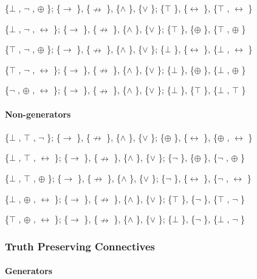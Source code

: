 \{$\bot$ , $\neg$ , $\oplus$ \}; \{$\to$ \}, \{$\nrightarrow$ \}, \{$\land$ \}, \{$\lor$ \}; \{$\top$ \}, \{$\leftrightarrow$ \}, \{$\top$ , $\leftrightarrow$ \}

\{$\bot$ , $\neg$ , $\leftrightarrow$ \}; \{$\to$ \}, \{$\nrightarrow$ \}, \{$\land$ \}, \{$\lor$ \}; \{$\top$ \}, \{$\oplus$ \}, \{$\top$ , $\oplus$ \}

\{$\top$ , $\neg$ , $\oplus$ \}; \{$\to$ \}, \{$\nrightarrow$ \}, \{$\land$ \}, \{$\lor$ \}; \{$\bot$ \}, \{$\leftrightarrow$ \}, \{$\bot$ , $\leftrightarrow$ \}

\{$\top$ , $\neg$ , $\leftrightarrow$ \}; \{$\to$ \}, \{$\nrightarrow$ \}, \{$\land$ \}, \{$\lor$ \}; \{$\bot$ \}, \{$\oplus$ \}, \{$\bot$ , $\oplus$ \}

\{$\neg$ , $\oplus$ , $\leftrightarrow$ \}; \{$\to$ \}, \{$\nrightarrow$ \}, \{$\land$ \}, \{$\lor$ \}; \{$\bot$ \}, \{$\top$ \}, \{$\bot$ , $\top$ \}

\hypertarget{non-generators-1}{%
\paragraph{Non-generators}\label{non-generators-1}}

\{$\bot$ , $\top$ , $\neg$ \}; \{$\to$ \}, \{$\nrightarrow$ \}, \{$\land$ \}, \{$\lor$ \}; \{$\oplus$ \}, \{$\leftrightarrow$ \}, \{$\oplus$ , $\leftrightarrow$ \}

\{$\bot$ , $\top$ , $\leftrightarrow$ \}; \{$\to$ \}, \{$\nrightarrow$ \}, \{$\land$ \}, \{$\lor$ \}; \{$\neg$ \}, \{$\oplus$ \}, \{$\neg$ , $\oplus$ \}

\{$\bot$ , $\top$ , $\oplus$ \}; \{$\to$ \}, \{$\nrightarrow$ \}, \{$\land$ \}, \{$\lor$ \}; \{$\neg$ \}, \{$\leftrightarrow$ \}, \{$\neg$ , $\leftrightarrow$ \}

\{$\bot$ , $\oplus$ , $\leftrightarrow$ \}; \{$\to$ \}, \{$\nrightarrow$ \}, \{$\land$ \}, \{$\lor$ \}; \{$\top$ \}, \{$\neg$ \}, \{$\top$ , $\neg$ \}

\{$\top$ , $\oplus$ , $\leftrightarrow$ \}; \{$\to$ \}, \{$\nrightarrow$ \}, \{$\land$ \}, \{$\lor$ \}; \{$\bot$ \}, \{$\neg$ \}, \{$\bot$ , $\neg$ \}

\hypertarget{truth-preserving-connectives}{%
\subsubsection{Truth Preserving
Connectives}\label{truth-preserving-connectives}}

\hypertarget{generators-2}{%
\paragraph{Generators}\label{generators-2}}


